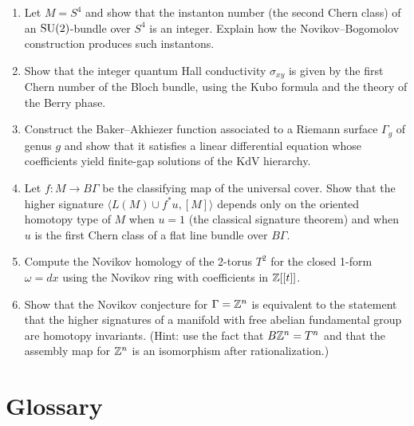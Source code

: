 \begin{enumerate}
    \item [I] Let \(M = S^4\) and show that the instanton number (the second Chern class) of an \(\operatorname{SU}(2)\)-bundle over \(S^4\) is an integer. Explain how the Novikov--Bogomolov construction produces such instantons.
    \item [I] Show that the integer quantum Hall conductivity \(\sigma_{xy}\) is given by the first Chern number of the Bloch bundle, using the Kubo formula and the theory of the Berry phase.
    \item [A] Construct the Baker--Akhiezer function associated to a Riemann surface \(\Gamma_g\) of genus \(g\) and show that it satisfies a linear differential equation whose coefficients yield finite-gap solutions of the KdV hierarchy.
    \item [I] Let \(f: M \to B\Gamma\) be the classifying map of the universal cover. Show that the higher signature \(\langle L(M) \cup f^* u, [M] \rangle\) depends only on the oriented homotopy type of \(M\) when \(u = 1\) (the classical signature theorem) and when \(u\) is the first Chern class of a flat line bundle over \(B\Gamma\).
    \item [I] Compute the Novikov homology of the 2-torus \(T^2\) for the closed 1-form \(\omega = dx\) using the Novikov ring with coefficients in \(\mathbb{Z}[[t]]\).
    \item [I] Show that the Novikov conjecture for \(\Gamma = \mathbb{Z}^n\) is equivalent to the statement that the higher signatures of a manifold with free abelian fundamental group are homotopy invariants. (Hint: use the fact that \(B\mathbb{Z}^n = T^n\) and that the assembly map for \(\mathbb{Z}^n\) is an isomorphism after rationalization.)
\end{enumerate}

\section*{Glossary}

